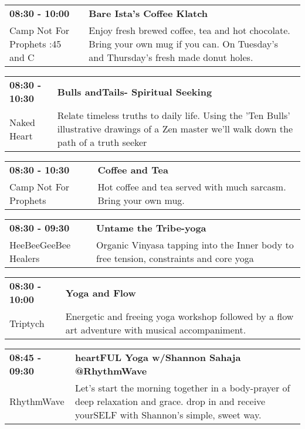 \begin{tabular}{ p{1in} p{2.2in} }
    \textbf{08:30 - 10:00} & \textbf{Bare Ista's Coffee Klatch } \\
    Camp Not For Prophets \newline 2:45 and C & Enjoy fresh brewed coffee, tea and hot chocolate. Bring your own mug if you can. On Tuesday's and Thursday's fresh made donut holes. \\
    \hline 
\end{tabular}
    
\begin{tabular}{ p{1in} p{2.2in} }
    \textbf{08:30 - 10:30} & \textbf{Bulls andTails-  Spiritual Seeking~} \\
    Naked Heart \newline  & Relate timeless truths to daily life. Using the 'Ten Bulls' illustrative drawings of a Zen master we'll walk down the path of a truth seeker \\
    \hline 
\end{tabular}
    
\begin{tabular}{ p{1in} p{2.2in} }
    \textbf{08:30 - 10:30} & \textbf{Coffee and Tea} \\
    Camp Not For Prophets \newline  & Hot coffee and tea served with much sarcasm.  Bring your own mug. \\
    \hline 
\end{tabular}
    
\begin{tabular}{ p{1in} p{2.2in} }
    \textbf{08:30 - 09:30} & \textbf{Untame the Tribe-yoga} \\
    HeeBeeGeeBee Healers \newline  & Organic Vinyasa tapping into the Inner body to free tension, constraints and core yoga \\
    \hline 
\end{tabular}
    
\begin{tabular}{ p{1in} p{2.2in} }
    \textbf{08:30 - 10:00} & \textbf{Yoga and Flow} \\
    Triptych \newline  & Energetic and freeing yoga workshop followed by a flow art adventure with musical accompaniment. \\
    \hline 
\end{tabular}
    
\begin{tabular}{ p{1in} p{2.2in} }
    \textbf{08:45 - 09:30} & \textbf{heartFUL Yoga w/Shannon Sahaja @RhythmWave} \\
    RhythmWave \newline  & Let's start the morning together in a body-prayer of deep relaxation and grace. drop in and receive yourSELF with Shannon's simple, sweet way. \\
    \hline 
\end{tabular}
    
